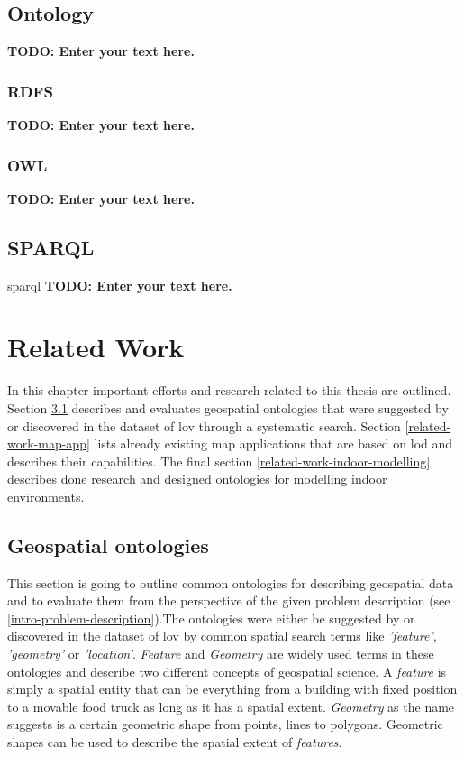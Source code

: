 \documentclass[draft,final]{vutinfth} %
\newcommand{\todo}[1]{{\color{red}\textbf{TODO: {#1}}}} %
\begin{document}
\section{Ontology}
\todo{Enter your text here.}

\subsection{RDFS}
\todo{Enter your text here.}

\subsection{OWL}
\todo{Enter your text here.}

\section{SPARQL}
\gls{sparql}
\todo{Enter your text here.}

\chapter{Related Work}
\label{related-work-chapter}

In this chapter important efforts and research related to this thesis are outlined. Section \ref{related-work-geospatial-ontologies} describes and evaluates geospatial ontologies that were suggested by \cite{tandy_spatial_2016} or discovered in the dataset of \gls{lov} through a systematic search. Section \ref{related-work-map-app} lists already existing map applications that are based on \gls{lod} and describes their capabilities. The final section \ref{related-work-indoor-modelling} describes done research and designed ontologies for modelling indoor environments.

\section{Geospatial ontologies}
\label{related-work-geospatial-ontologies}
This section is going to outline common ontologies for describing geospatial data and to evaluate them from the perspective of the given problem description (see \ref{intro-problem-description}).The ontologies were either be suggested by \cite{tandy_spatial_2016} or discovered in the dataset of \gls{lov} by common spatial search terms like \textit{'feature'}, \textit{'geometry'} or \textit{'location'}. \textit{Feature} and \textit{Geometry} are widely used terms in these ontologies and describe two different concepts of geospatial science. A \textit{feature}  is simply a spatial entity that can be everything from a building with fixed position to a movable food truck as long as it has a spatial extent. \textit{Geometry} as the name suggests is a certain geometric shape from points, lines to polygons. Geometric shapes can be used to describe  the spatial extent of \textit{features}.
\end{document}
